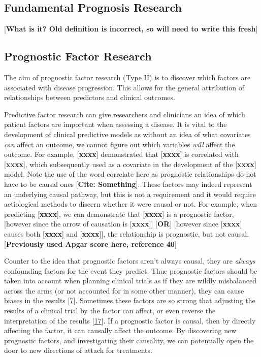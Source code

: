 \documentclass[12pt,PhD,twoside,openright]{muthesis}
\begin{document}
\hypertarget{fundamental-prognosis-research}{%
\subsection{Fundamental Prognosis Research}\label{fundamental-prognosis-research}}

{[}\textbf{What is it? Old definition is incorrect, so will need to write this fresh}{]}

\hypertarget{prognostic-factor-research}{%
\subsection{Prognostic Factor Research}\label{prognostic-factor-research}}

The aim of prognostic factor research (Type II) is to discover which factors are associated with disease progression. This allows for the general attribution of relationships between predictors and clinical outcomes.

Predictive factor research can give researchers and clinicians an idea of which patient factors are important when assessing a disease. It is vital to the development of clinical predictive models as without an idea of what covariates \emph{can} affect an outcome, we cannot figure out which variables \emph{will} affect the outcome. For example, {[}\textbf{xxxx}{]} demonstrated that {[}\textbf{xxxx}{]} is correlated with {[}\textbf{xxxx}{]}, which subsequently used as a covariate in the development of the {[}\textbf{xxxx}{]} model. Note the use of the word correlate here as prognostic relationships do not have to be causal ones {[}\textbf{Cite: Something}{]}. These factors may indeed represent an underlying causal pathway, but this is not a requirement and it would require aetiological methods to discern whether it were causal or not. For example, when predicting {[}\textbf{xxxx}{]}, we can demonstrate that {[}\textbf{xxxx}{]} is a prognostic factor, {[}however since the arrow of causation is {[}\textbf{xxxx}{]}{]} {[}\textbf{OR}{]} {[}however since {[}\textbf{xxxx}{]} causes both {[}\textbf{xxxx}{]} and {[}\textbf{xxxx}{]}{]}, the relationship is prognostic, but not causal. {[}\textbf{Previously used Apgar score here, reference 40}{]}

Counter to the idea that prognostic factors aren't always causal, they are \emph{always} confounding factors for the event they predict. Thue prognostic factors should be taken into account when planning clinical trials as if they are wildly misbalanced across the arms (or not accounted for in some other manner), they can cause biases in the results {[}\protect\hyperlink{ref-riley_prognosis_2013}{7}{]}. Sometimes these factors are so strong that adjusting the results of a clinical trial by the factor can affect, or even reverse the interpretation of the results {[}\protect\hyperlink{ref-royston_dichotomizing_2006}{17}{]}. If a prognostic factor is causal, then by directly affecting the factor, it can causally affect the outcome. By discovering new prognostic factors, and investigating their causality, we can potentially open the door to new directions of attack for treatments.
\end{document}
